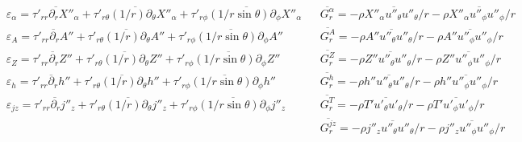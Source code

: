 \documentclass[10pt,paper=a4]{report}
\newcommand{\eht}{\overline}
\begin{document}
\begin{table*}
\begin{align}
& \varepsilon_\alpha = \eht{\tau'_{rr}\partial_r X''_\alpha} + \eht{\tau'_{r\theta}(1/r)\partial_\theta X''_\alpha} + \eht{\tau'_{r\phi}(1/r\sin{\theta})\partial_\phi X''_\alpha} & & \eht{G^{\alpha}_r} =  -\eht{\rho X''_\alpha u''_\theta u''_\theta/r} - \eht{\rho X''_\alpha u''_\phi u''_\phi/r} \nonumber \\  
& \varepsilon_A = \eht{\tau'_{rr}\partial_r A''} + \eht{\tau'_{r\theta}(1/r)\partial_\theta A''} + \eht{\tau'_{r\phi}(1/r\sin{\theta})\partial_\phi A''} & & \eht{G^A_r} =  -\eht{\rho A'' u''_\theta u''_\theta/r} - \eht{\rho A'' u''_\phi u''_\phi/r} \nonumber \\
& \varepsilon_Z = \eht{\tau'_{rr}\partial_r Z''} + \eht{\tau'_{r\theta}(1/r)\partial_\theta Z''} + \eht{\tau'_{r\phi}(1/r\sin{\theta})\partial_\phi Z''}& & \eht{G^Z_r} =  -\eht{\rho Z'' u''_\theta u''_\theta/r} - \eht{\rho Z'' u''_\phi u''_\phi/r} \nonumber \\
& \varepsilon_{h} = \eht{\tau'_{rr}\partial_r h''} + \eht{\tau'_{r\theta}(1/r)\partial_\theta h''} + \eht{\tau'_{r\phi}(1/r\sin{\theta})\partial_\phi h''} & & \eht{G^h_r} = -\eht{\rho h'' u''_\theta u''_\theta/r} - \eht{\rho h'' u''_\phi u''_\phi/r} \nonumber \\
& \varepsilon_{jz} = \eht{\tau'_{rr}\partial_r j''_z} + \eht{\tau'_{r\theta}(1/r)\partial_\theta j''_z} + \eht{\tau'_{r\phi}(1/r\sin{\theta})\partial_\phi j''_z} & & \eht{G^T_r} = -\eht{\rho T' u'_\theta u'_\theta/r} - \eht{\rho T' u'_\phi u'_\phi/r} \nonumber \\
& & & \eht{G^{jz}_r} = -\eht{\rho j''_z u''_\theta u''_\theta/r} - \eht{\rho j''_z u''_\phi u''_\phi/r} \nonumber 
\end{align}
\end{table*}

\newpage
\end{document}
